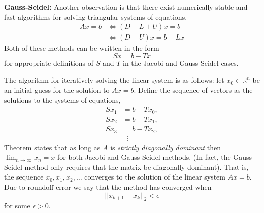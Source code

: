 \documentclass[12pt]{article}
\begin{document}
{\bf Gauss-Seidel:} Another observation is that there exist numerically stable
and fast algorithms for solving triangular systems of equations.
\begin{align*}
  Ax = b
&\Leftrightarrow
(D + L + U)x = b \\
&\Leftrightarrow
(D+U)x = b - Lx
\end{align*}
Both of these methods can be written in the form
\[
  Sx = b - Tx
\]
for appropriate definitions of $S$ and $T$ in the Jacobi and Gauss Seidel cases.

The algorithm for iteratively solving the linear system is as follows: let $x_0
\in \mathbb{R}^n$ be an initial guess for the solution to $Ax = b$. Define the
sequence of vectors as the solutions to the systems of equations,
\begin{align*}
  Sx_1 &= b - Tx_0, \\
  Sx_2 &= b - Tx_1, \\
  Sx_3 &= b - Tx_2, \\
       & \; \; \vdots
\end{align*}
Theorem states that as long as $A$ is {\it strictly diagonally dominant} then
$\lim_{n\to\infty} x_n = x$ for both Jacobi and Gauss-Seidel methods. (In fact,
the Gauss-Seidel method only requires that the matrix be diagonally dominant).
That is, the sequence $x_0, x_1, x_2, \ldots$ converges to the solution of the
linear system $Ax=b$. Due to roundoff error we say that the method has converged
when 
\[
  ||x_{k+1} - x_k||_2 < \epsilon
\]
for some $\epsilon > 0$.
\end{document}
